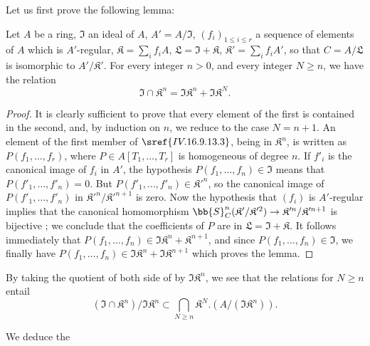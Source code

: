 Let us first prove the following lemma:

\begin{lemma}[16.9.13.2]
\label{IV.16.9.13.2}
Let $A$ be a ring, $\mathfrak{I}$ an ideal of $A$, $A' = A/\mathfrak{I}$, $(f_i)_{1 \leq i \leq r}$ a sequence of elements of $A$ which is $A'$-regular, $\mathfrak{K} = \sum_i f_i A$, $\mathfrak{L} = \mathfrak{I} + \mathfrak{K}$, $\mathfrak{K}' = \sum_i f_i A'$, so that $C = A/\mathfrak{L}$ is isomorphic to $A'/\mathfrak{K}'$.
For every integer $n > 0$, and every integer $N \geq n$, we have the relation
\[
  \label{IV.16.9.13.3}
  \mathfrak{I} \cap \mathfrak{K}^n = \mathfrak{I}\mathfrak{K}^n + \mathfrak{I}\mathfrak{K}^N.
  \tag{16.9.13.3}
\]
\end{lemma}

\begin{proof}
It is clearly sufficient to prove that every element of the first is contained in the second, and, by induction on $n$, we reduce to the case $N = n + 1$.
An element of the first member of $\sref{IV.16.9.13.3}$, being in $\mathfrak{K}^n$, is written as $P(f_1, \dots, f_r)$, where $P \in A[T_1, \dots, T_r]$ is homogeneous of degree $n$.
If $f'_i$ is the canonical image of $f_i$ in $A'$, the hypothesis $P(f_1, \dots, f_n) \in \mathfrak{I}$ means that $P(f'_1, \dots, f'_n) = 0$.
But $P(f'_1, \dots, f'_n) \in \mathfrak{K}'^n$, so the canonical image of $P(f'_1, \dots, f'_n)$ in $\mathfrak{K}'^n/\mathfrak{K}'^{n+1}$ is zero.
Now the hypothesis that $(f_i)$ is $A'$-regular implies that the canonical homomorphism $\bb{S}_C^n(\mathfrak{K}'/\mathfrak{K}'^2) \to \mathfrak{K}'^n/\mathfrak{K}'^{n+1}$ is bijective ;
we conclude that the coefficients of $P$ are in $\mathfrak{L} = \mathfrak{I} + \mathfrak{K}$.
It follows immediately that $P(f_1, \dots, f_n) \in \mathfrak{I}\mathfrak{K}^n + \mathfrak{K}^{n+1}$, and since $P(f_1, \dots, f_n) \in \mathfrak{I}$, we finally have $P(f_1, \dots, f_n) \in \mathfrak{I}\mathfrak{K}^n + \mathfrak{I}\mathfrak{K}^{n+1}$ which proves the lemma.
\end{proof}

By taking the quotient of both side of  by $\mathfrak{I}\mathfrak{K}^{n}$, we see that the relations  for $N \geq n$ entail
\[
  \label{IV.16.9.13.4}
  (\mathfrak{I} \cap \mathfrak{K}^n)/\mathfrak{I}\mathfrak{K}^n \subset \bigcap_{N \geq n} \mathfrak{K}^N .(A/(\mathfrak{I}\mathfrak{K}^n)).  
  \tag{16.9.13.4}
\]

We deduce the

